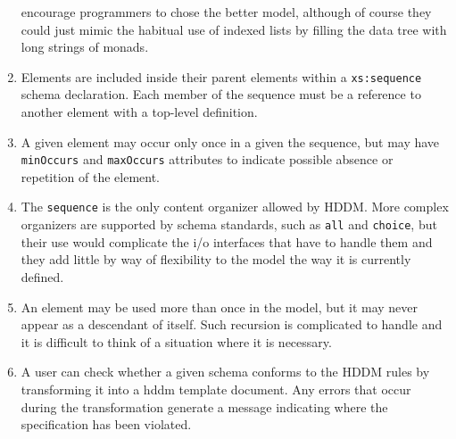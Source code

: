 \documentclass{revtex4}
\begin{document}
\begin{enumerate}
encourage programmers to chose the better model, although of
course they could just mimic the habitual use of indexed lists
by filling the data tree with long strings of monads.
\item  Elements are included inside their parent elements
within a \texttt{xs:sequence} schema declaration. Each member
of the sequence must be a reference to another element with a
top-level definition.
\item  A given element may occur only once in a given the
sequence, but may have \texttt{minOccurs} and \texttt{maxOccurs}
attributes to indicate possible absence or repetition of the element. 
\item  The \texttt{sequence} is the only content organizer
allowed by HDDM. More complex organizers are supported by schema
standards, such as \texttt{all} and \texttt{choice}, but their
use would complicate the i/o interfaces that have to handle
them and they add little by way of flexibility to the model
the way it is currently defined. 
\item  An element may be used more than once in the model,
but it may never appear as a descendant of itself. Such recursion
is complicated to handle and it is difficult to think of a situation
where it is necessary. 
\item  A user can check whether a given schema conforms to the
HDDM rules by transforming it into a hddm template document.
Any errors that occur during the transformation generate a 
message indicating where the specification has been violated. 
\end{enumerate}
\end{document}
